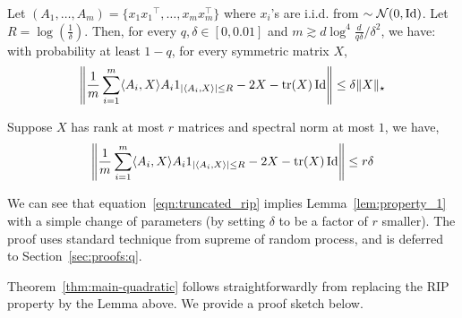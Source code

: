 \begin{lem}\label{lem:gaussian_concentration}
Let $(A_1,\dots, A_m) = \{ x_1{x_1}^\top, \dots,  x_mx_m^\top\}$ where $x_i$'s are  i.i.d. from $\sim \mathcal{N}(0, \operatorname{Id})$. Let  $R = \log\left(\frac{1}{ \delta}\right)$. Then, for every $q, \delta \in [ 0, 0.01]$ and $m \gtrsim d   \log^4 \frac{d}{q \delta }/\delta^2$, we have:  with probability at least $1 - q$, for every symmetric matrix $X$,
\begin{align*}
\left\|\frac{1}{m} \sum_{i = 1}^m \langle A_i, X \rangle A_i 1_{|\langle A_i, X \rangle| \leq R} - 2 X - \textup{tr}(X) \operatorname{Id}\right\| \leq \delta \| {X} \|_{\star}
\end{align*}
\end{lem}
\noindent Suppose $X$ has rank at most  $r$ matrices and spectral norm at most $1$, we have, 
\begin{align}
\left\|\frac{1}{m} \sum_{i = 1}^m \langle A_i, X \rangle A_i 1_{|\langle A_i, X \rangle| \leq R} - 2 X - \textup{tr}(X) \operatorname{Id}\right\| \leq r\delta\label{eqn:truncated_rip}
\end{align}

We can see that equation~\eqref{eqn:truncated_rip} implies Lemma~\ref{lem:property_1} with a simple change of parameters (by setting $\delta$ to be a factor of $r$ smaller). The proof uses standard technique from supreme of random process, and is deferred to Section~\ref{sec:proofs:q}. 

Theorem~\ref{thm:main-quadratic} follows straightforwardly from replacing the RIP property by the Lemma above. We provide a proof sketch below. 

